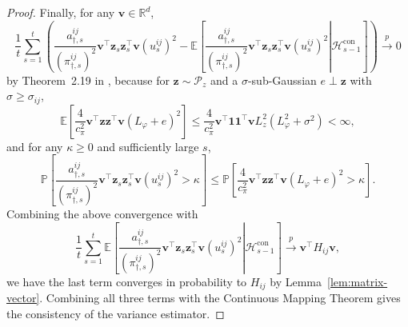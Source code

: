 \documentclass[12pt]{article}
\begin{document}
\begin{proof}
Finally, for any $\bm v\in\mathbb R^d$,
\[
\frac{1}{t}
\sum_{s=1}^t
\left(
\frac{a_{\dagger,s}^{ij}}{(\pi_{\dagger,s}^{ij})^2}
\bm v^\top\bm z_s\bm z_s^\top\bm v
(u_s^{ij}) ^2
-
\mathbb E
\left[
\left.
\frac{a_{\dagger,s}^{ij}}{(\pi_{\dagger,s}^{ij})^2}
\bm v^\top\bm z_s\bm z_s^\top\bm v
(u_s^{ij}) ^2
\right|
\mathcal H_{s-1}^{\mathrm{con}}
\right]
\right)
\stackrel{p}{\to} 0
\]
by Theorem~2.19 in \citet{hall1980martingale}, because for $\bm z\sim\mathcal P_z$ and a $\sigma$-sub-Gaussian $e\perp \bm z$ with $\sigma \ge \sigma_{ij}$,
\[
\mathbb E
\left[
\frac{4}{c_\pi^2}
\bm v^\top\bm z\bm z^\top\bm v
\left(
L_\varphi+e
\right)^2
\right]
\le
\frac{4}{c_\pi^2}
\bm v^\top\bm 1\bm 1^\top\bm v
L_z^2
\left(
L_\varphi^2+\sigma^2
\right)
<\infty,
\]
and for any $\kappa\ge0$ and sufficiently large $s$,
\[
\mathbb P
\left[
\frac{a_{\dagger,s}^{ij}}{(\pi_{\dagger,s}^{ij})^2}
\bm v^\top\bm z_s\bm z_s^\top\bm v
(u_s^{ij}) ^2
>
\kappa
\right]
\le
\mathbb P
\left[
\frac{4}{c_\pi^2}
\bm v^\top\bm z\bm z^\top\bm v
\left(
L_\varphi+e
\right)^2
>
\kappa
\right].
\]
Combining the above convergence with
\[
\frac{1}{t}
\sum_{s=1}^t
\mathbb E
\left[
\left.
\frac{
a_{\dagger,s}^{ij}
}{
(\pi_{\dagger,s}^{ij})^2
}
\bm v^\top\bm z_s\bm z_s^\top\bm v
(u_s^{ij}) ^2
\right|
\mathcal H_{s-1}^{\mathrm{con}}
\right]
\stackrel{p}{\to}
\bm v^\top H_{ij}\bm v,
\]
we have the last term converges in probability to $H_{ij}$ by Lemma~\ref{lem:matrix-vector}. Combining all three terms with the Continuous Mapping Theorem gives the consistency of the variance estimator.
\end{proof}
\end{document}
